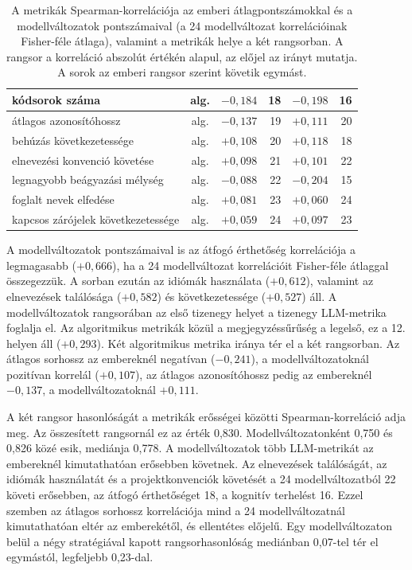 \documentclass[
]{elteikthesis}[2024/04/26]
\begin{document}
\begin{table}[htbp]
{\begin{tabular}{ | l | c | r | r | r | r | }
		\hline
		kódsorok száma & alg. & $-0{,}184$ & 18 & $-0{,}198$ & 16 \\
		\hline
		átlagos azonosítóhossz & alg. & $-0{,}137$ & 19 & $+0{,}111$ & 20 \\
		\hline
		behúzás következetessége & alg. & $+0{,}108$ & 20 & $+0{,}118$ & 18 \\
		\hline
		elnevezési konvenció követése & alg. & $+0{,}098$ & 21 & $+0{,}101$ & 22 \\
		\hline
		legnagyobb beágyazási mélység & alg. & $-0{,}088$ & 22 & $-0{,}204$ & 15 \\
		\hline
		foglalt nevek elfedése & alg. & $+0{,}081$ & 23 & $+0{,}060$ & 24 \\
		\hline
		kapcsos zárójelek következetessége & alg. & $+0{,}059$ & 24 & $+0{,}097$ & 23 \\
		\hline
	\end{tabular}}
	\caption[A metrikák és a pontszámok kapcsolata]{A metrikák Spearman-korrelációja az emberi
	átlagpontszámokkal és a modellváltozatok pontszámaival (a 24 modellváltozat korrelációinak Fisher-féle
	átlaga), valamint a metrikák helye a két rangsorban. A rangsor a korreláció abszolút értékén alapul, az
	előjel az irányt mutatja. A sorok az emberi rangsor szerint követik egymást.}
	\label{tab:results:metrics}
\end{table}

A modellváltozatok pontszámaival is az átfogó érthetőség korrelációja a
legmagasabb ($+0{,}666$), ha a 24 modellváltozat korrelációit Fisher-féle
átlaggal összegezzük. A sorban ezután az idiómák használata ($+0{,}612$),
valamint az elnevezések találósága ($+0{,}582$) és következetessége ($+0{,}527$)
áll. A modellváltozatok rangsorában az első tizenegy helyet a tizenegy
LLM-metrika foglalja el. Az algoritmikus metrikák közül a megjegyzéssűrűség a
legelső, ez a 12. helyen áll ($+0{,}293$). Két algoritmikus metrika iránya tér
el a két rangsorban. Az átlagos sorhossz az embereknél negatívan ($-0{,}241$), a
modellváltozatoknál pozitívan korrelál ($+0{,}107$), az átlagos azonosítóhossz
pedig az embereknél $-0{,}137$, a modellváltozatoknál $+0{,}111$.

A két rangsor hasonlóságát a metrikák erősségei közötti Spearman-korreláció adja
meg. Az összesített rangsornál ez az érték 0,830. Modellváltozatonként 0,750 és
0,826 közé esik, mediánja 0,778. A modellváltozatok több LLM-metrikát az
embereknél kimutathatóan erősebben követnek. Az elnevezések találóságát, az
idiómák használatát és a projektkonvenciók követését a 24 modellváltozatból 22
követi erősebben, az átfogó érthetőséget 18, a kognitív terhelést 16. Ezzel
szemben az átlagos sorhossz korrelációja mind a 24 modellváltozatnál
kimutathatóan eltér az emberekétől, és ellentétes előjelű. Egy modellváltozaton
belül a négy stratégiával kapott rangsorhasonlóság mediánban 0,07-tel tér el
egymástól, legfeljebb 0,23-dal.
\end{document}
